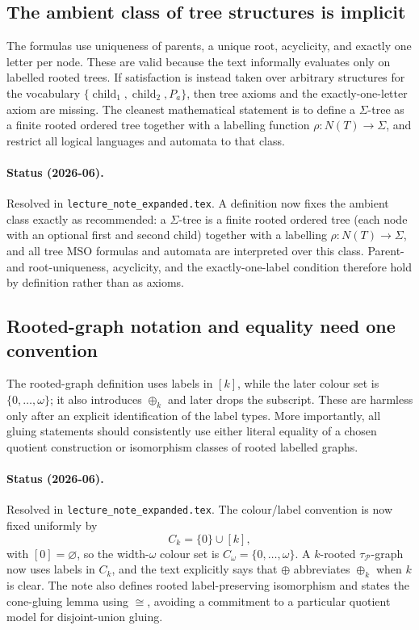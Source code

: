 \documentclass[11pt]{article}
\newcommand{\MSO}{\ensuremath{\mathrm{MSO}}}
\begin{document}
\subsection{The ambient class of tree structures is implicit}

The formulas use uniqueness of parents, a unique root, acyclicity, and exactly
one letter per node.  These are valid because the text informally evaluates
only on labelled rooted trees.  If satisfaction is instead taken over arbitrary
structures for the vocabulary
\(\{\operatorname{child}_1,\operatorname{child}_2,P_a\}\), then tree axioms and
the exactly-one-letter axiom are missing.  The cleanest mathematical statement
is to define a \(\Sigma\)-tree as a finite rooted ordered tree together with a
labelling function \(\rho:N(T)\to\Sigma\), and restrict all logical languages and
automata to that class.

\paragraph{Status (2026-06).} Resolved in \texttt{lecture\_note\_expanded.tex}.
A definition now fixes the ambient class exactly as recommended: a
\(\Sigma\)-tree is a finite rooted ordered tree (each node with an optional first
and second child) together with a labelling \(\rho:N(T)\to\Sigma\), and all tree
\MSO{} formulas and automata are interpreted over this class.  Parent- and
root-uniqueness, acyclicity, and the exactly-one-label condition therefore hold by
definition rather than as axioms.

\subsection{Rooted-graph notation and equality need one convention}

The rooted-graph definition uses labels in \([k]\), while the later colour set is
\(\{0,\ldots,\omega\}\); it also introduces \(\oplus_k\) and later drops the
subscript.  These are harmless only after an explicit identification of the
label types.  More importantly, all gluing statements should consistently use
either literal equality of a chosen quotient construction or isomorphism
classes of rooted labelled graphs.

\paragraph{Status (2026-06).} Resolved in \texttt{lecture\_note\_expanded.tex}.
The colour/label convention is now fixed uniformly by
\[
  C_k=\{0\}\cup[k],
\]
with \([0]=\varnothing\), so the width-\(\omega\) colour set is
\(C_\omega=\{0,\ldots,\omega\}\).  A \(k\)-rooted
\(\tau_{\mathcal P}\)-graph now uses labels in \(C_k\), and the text explicitly
says that \(\oplus\) abbreviates \(\oplus_k\) when \(k\) is clear.  The note also
defines rooted label-preserving isomorphism and states the cone-gluing lemma
using \(\cong\), avoiding a commitment to a particular quotient model for
disjoint-union gluing.
\end{document}
